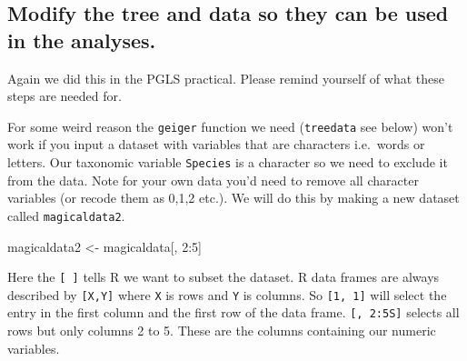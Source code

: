 \documentclass[]{book}
\newenvironment{Shaded}{\begin{snugshade}}{\end{snugshade}}
\newcommand{\KeywordTok}[1]{\textcolor[rgb]{0.13,0.29,0.53}{\textbf{{#1}}}}
\newcommand{\DecValTok}[1]{\textcolor[rgb]{0.00,0.00,0.81}{{#1}}}
\newcommand{\StringTok}[1]{\textcolor[rgb]{0.31,0.60,0.02}{{#1}}}
\newcommand{\CommentTok}[1]{\textcolor[rgb]{0.56,0.35,0.01}{\textit{{#1}}}}
\newcommand{\NormalTok}[1]{{#1}}
\theoremstyle{definition}
\theoremstyle{definition}
\theoremstyle{definition}
\theoremstyle{remark}
\begin{document}
\subsection{Modify the tree and data so they can be used in the
analyses.}\label{modify-the-tree-and-data-so-they-can-be-used-in-the-analyses.}

Again we did this in the PGLS practical. Please remind yourself of what
these steps are needed for.

\begin{Shaded}
\end{Shaded}

For some weird reason the \texttt{geiger} function we need
(\texttt{treedata} see below) won't work if you input a dataset with
variables that are characters i.e.~words or letters. Our taxonomic
variable \texttt{Species} is a character so we need to exclude it from
the data. Note for your own data you'd need to remove all character
variables (or recode them as 0,1,2 etc.). We will do this by making a
new dataset called \texttt{magicaldata2}.

\begin{Shaded}
\begin{Highlighting}[]
\NormalTok{magicaldata2 <-}\StringTok{ }\NormalTok{magicaldata[, }\DecValTok{2}\NormalTok{:}\DecValTok{5}\NormalTok{]}
\end{Highlighting}
\end{Shaded}

Here the \texttt{{[}\ {]}} tells R we want to subset the dataset. R data
frames are always described by \texttt{{[}X,Y{]}} where \texttt{X} is
rows and \texttt{Y} is columns. So \texttt{{[}1,\ 1{]}} will select the
entry in the first column and the first row of the data frame.
\texttt{{[},\ 2:5S{]}} selects all rows but only columns 2 to 5. These
are the columns containing our numeric variables.
\end{document}
